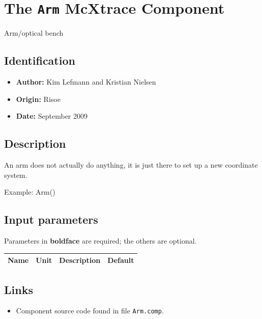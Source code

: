 \section{The \texttt{Arm} McXtrace Component}
Arm/optical bench

\subsection*{Identification}
\begin{itemize}
  \item \textbf{Author:} Kim Lefmann and Kristian Nielsen
  \item \textbf{Origin:} Risoe
  \item \textbf{Date:} September 2009
\end{itemize}

\subsection*{Description}
An arm does not actually do anything, it is just there to set up a new coordinate system.

Example: Arm()

\subsection*{Input parameters}
Parameters in \textbf{boldface} are required; the others are optional.

\begin{longtable}{p{}p{}p{}p{}}
\toprule
\textbf{Name} & \textbf{Unit} & \textbf{Description} & \textbf{Default} \\
\midrule
\endhead
\bottomrule
\end{longtable}

\subsection*{Links}
\begin{itemize}
  \item Component source code found in file \texttt{Arm.comp}.
\end{itemize}
